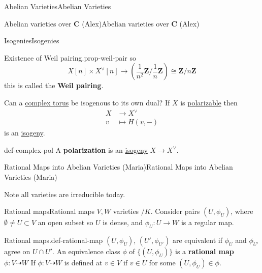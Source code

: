 \documentclass[10pt,]{book}
\newcommand{\terminology}[1]{\textbf{#1}}
\numberwithin{equation}{section}
\newcommand{\ZZ}{\mathbf{Z}}
\newcommand{\CC}{\mathbf{C}}
\newcommand{\amp}{&}
\begin{document}
\begin{chapterptx}{Abelian Varieties}{}{Abelian Varieties}{}{}
\begin{sectionptx}{Abelian varieties over \(\CC\) (Alex)}{}{Abelian varieties over \(\CC\) (Alex)}{}{}
\begin{subsectionptx}{Isogenies}{}{Isogenies}{}{}
\begin{proposition}{Existence of Weil pairing.}{}{prop-weil-pair}
so%
\begin{equation*}
X[n] \times X^\vee[n] \to \left(\frac{1}{n^2} \ZZ/\frac{1}{n} \ZZ\right) \cong \ZZ/n\ZZ
\end{equation*}
this is called the \terminology{Weil pairing}.%
\end{proposition}
\hypertarget{p-80}{}%
Can a \hyperref[def-complex-torus]{complex torus} be isogenous to its own dual? If \(X\) is \hyperref[def-polarizable]{polarizable} then%
\begin{align*}
X \amp\to X^\vee\\
v\amp\mapsto H(v,-)
\end{align*}
is an \hyperref[def-supersing-isog-isog]{isogeny}.%
\begin{definition}{}{def-complex-pol}%
\hypertarget{p-81}{}%
A \terminology{polarization} is an \hyperref[def-supersing-isog-isog]{isogeny} \(X \to X^\vee\).%
\end{definition}
\end{subsectionptx}
\end{sectionptx}
%
%
\typeout{************************************************}
\typeout{************************************************}
%
\begin{sectionptx}{Rational Maps into Abelian Varieties (Maria)}{}{Rational Maps into Abelian Varieties (Maria)}{}{}\label{sec-rational-maps-avs}
\begin{introduction}{}%
\hypertarget{p-82}{}%
Note all varieties are irreducible today.%
\end{introduction}%
%
%
\typeout{************************************************}
\typeout{************************************************}
%
\begin{subsectionptx}{Rational maps}{}{Rational maps}{}{}\label{subsection-8}
\hypertarget{p-83}{}%
\(V,W\) varieties \(/K\). Consider pairs \((U,\phi_U)\), where \(\emptyset \ne  U \subset V\) an open subset so \(U\) is dense, and \(\phi_U \colon U \to W\) is a regular map.%
\begin{definition}{Rational maps.}{def-rational-map}%
\hypertarget{p-84}{}%
\((U,\phi_U)\), \((U',{\phi_{U'}})\) are equivalent if \(\phi_U\) and \(\phi_{U'}\) agree on \(U \cap U'\). An equivalence class \(\phi\) of \(\{(U, \phi_U)\}\) is a \terminology{rational map} \(\phi \colon V \dashrightarrow W\) If \(\phi\colon V \dashrightarrow W\) is defined at   \(v\in V\) if \(v\in U\) for some \((U,\phi_U) \in \phi\).%
\end{definition}

\end{subsectionptx}
\end{sectionptx}
\end{chapterptx}
\end{document}
